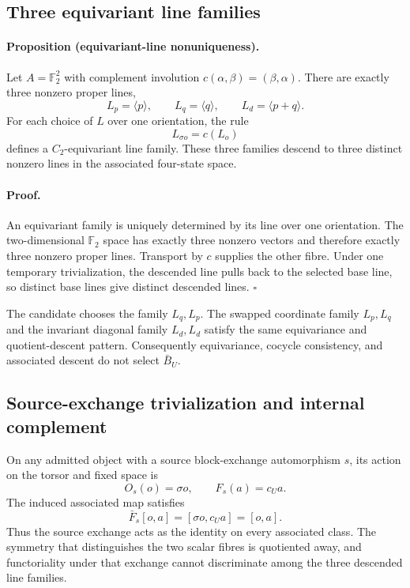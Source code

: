\subsection{Three equivariant line families}

\paragraph{Proposition (equivariant-line nonuniqueness).}
Let \(A=\mathbb F_2^2\) with complement involution
\(c(\alpha,\beta)=(\beta,\alpha)\).  There are exactly three nonzero proper
lines,
\[
 L_p=\langle p\rangle,\qquad
 L_q=\langle q\rangle,\qquad
 L_d=\langle p+q\rangle.
\]
For each choice of \(L\) over one orientation, the rule
\[
 L_{\sigma o}=c(L_o)
\]
defines a \(C_2\)-equivariant line family.  These three families descend to
three distinct nonzero lines in the associated four-state space.

\paragraph{Proof.}
An equivariant family is uniquely determined by its line over one orientation.
The two-dimensional \(\mathbb F_2\) space has exactly three nonzero vectors and
therefore exactly three nonzero proper lines.  Transport by \(c\) supplies the
other fibre.  Under one temporary trivialization, the descended line pulls
back to the selected base line, so distinct base lines give distinct descended
lines. \(\square\)

The candidate chooses the family \(L_q,L_p\).  The swapped coordinate family
\(L_p,L_q\) and the invariant diagonal family \(L_d,L_d\) satisfy the same
equivariance and quotient-descent pattern.  Consequently equivariance,
cocycle consistency, and associated descent do not select \(\bar B_U\).

\subsection{Source-exchange trivialization and internal complement}

On any admitted object with a source block-exchange automorphism \(s\), its
action on the torsor and fixed space is
\[
 O_s(o)=\sigma o,\qquad F_s(a)=c_Ua.
\]
The induced associated map satisfies
\[
 \bar F_s[o,a]=[\sigma o,c_Ua]=[o,a].
\]
Thus the source exchange acts as the identity on every associated class.  The
symmetry that distinguishes the two scalar fibres is quotiented away, and
functoriality under that exchange cannot discriminate among the three
descended line families.

